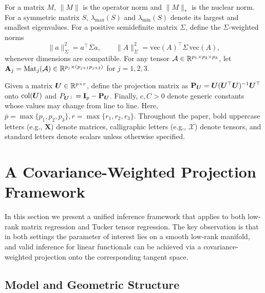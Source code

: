 \documentclass[authoryear,preprint,review,12pt]{elsarticle}
\begin{document}
	For a matrix $M$, $\|M\|$ is the operator norm and $\|M\|_*$ is the nuclear norm.
	For a symmetric matrix $S$, $\lambda_{\max}(S)$ and $\lambda_{\min}(S)$ denote its largest and
	smallest eigenvalues.
	For a positive semidefinite matrix $\Sigma$, define the $\Sigma$-weighted norms
	\[
	\|a\|_\Sigma^2 = a^\top \Sigma a,\qquad
	\|A\|_\Sigma^2 = \mathrm{vec}(A)^\top \Sigma\,\mathrm{vec}(A),
	\]
	whenever dimensions are compatible.
	For any tensor $\mathcal{A}\in\mathbb{R}^{p_1\times p_2\times p_3}$, let $\mathbf{A}_j=\mathrm{Mat}_j(\mathcal{A})\in\mathbb{R}^{p_j\times (p_{j+1}p_{j+2})}$ for $j=1,2,3$. 
	
	Given a matrix $\boldsymbol U\in\mathbb{R}^{p\times r}$, define the projection matrix as $\mathbf{P}_{\boldsymbol U}=\boldsymbol U( \boldsymbol U^{\top}\boldsymbol U)^{-1}\boldsymbol U^\top$  onto
	$\mathrm{col}(\boldsymbol U)$ and $P_{\boldsymbol U^\perp}=\mathbf{I}_p-\mathbf{P}_{\boldsymbol U}$. 
	Finally, $c,C>0$ denote generic constants whose values may change from line to line.
	Here, $\bar p=\max\{p_1,p_2,p_3\}, r=\max\{r_1,r_2,r_3\}$.
	Throughout the paper, bold uppercase letters (e.g., $\mathbf{X}$) denote matrices, 
	calligraphic letters (e.g., $\mathcal{X}$) denote tensors, 
	and standard letters denote scalars unless otherwise specified.
	
	
	
	\section{A Covariance-Weighted Projection Framework}\label{sec:framework}
	
	In this section we present a unified inference framework that
	applies to both low-rank matrix regression and Tucker tensor regression.
	The key observation is that in both settings the parameter of interest
	lies on a smooth low-rank manifold, and valid inference for linear
	functionals can be achieved via a covariance-weighted projection
	onto the corresponding tangent space.
	
	\subsection{Model and Geometric Structure}
	
\end{document}

